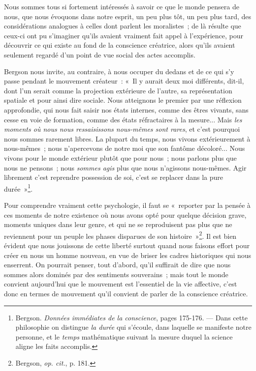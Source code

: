 \documentclass[french,twoside]{book} %
\begin{document}
 Nous sommes tous si fortement intéressés à savoir ce que le monde pensera de nous, que nous évoquons dans notre esprit, un peu plus tôt, un peu plus tard, des considérations analogues à celles dont parlent les moralistes ; de là résulte que ceux-ci ont pu s’imaginer qu’ils avaient vraiment fait appel à l’expérience, pour découvrir ce qui existe au fond de la conscience créatrice, alors qu’ils avaient seulement regardé d’un point de vue social des actes accomplis.\par
Bergson nous invite, au contraire, à nous occuper du dedans et de ce qui s’y passe pendant le mouvement créateur : « Il y aurait deux moi différents, dit-il, dont l’un serait comme la projection extérieure de l’autre, sa représentation spatiale et pour ainsi dire sociale. Nous atteignons le premier par une réflexion approfondie, qui nous fait saisir nos états internes, comme des êtres vivants, sans cesse en voie de formation, comme des états réfractaires à la mesure... Mais \emph{les moments où nous nous ressaisissons nous-mêmes sont rares}, et c’est pourquoi nous sommes rarement libres. La plupart du temps, nous vivons extérieurement à nous-mêmes ; nous n’apercevons  de notre moi que son fantôme décoloré... Nous vivons pour le monde extérieur plutôt que pour nous ; nous parlons plus que nous ne pensons ; nous \emph{sommes agis} plus que nous n’agissons nous-mêmes. Agir librement c’est reprendre possession de soi, c’est se replacer dans la pure durée »\footnote{ \noindent Bergson. \emph{Données immédiates de la conscience}, pages 175-176. — Dans cette philosophie on distingue \emph{la durée} qui s’écoule, dans laquelle se manifeste notre personne, et le \emph{temps} mathématique suivant la mesure duquel la science aligne les faits accomplis.
 }.\par
Pour comprendre vraiment cette psychologie, il faut se « reporter par la pensée à ces moments de notre existence où nous avons opté pour quelque décision grave, moments uniques dans leur genre, et qui ne se reproduisent pas plus que ne reviennent pour un peuple les phases disparues de son histoire »\footnote{ \noindent Bergson, \emph{op. cit.}, p. 181.
 }. Il est bien évident que nous jouissons de cette liberté surtout quand nous faisons effort pour créer en nous un homme nouveau, en vue de briser les cadres historiques qui nous enserrent. On pourrait penser, tout d’abord, qu’il suffirait de dire que nous sommes alors dominés par des sentiments souverains ; mais tout le monde convient aujourd’hui que le mouvement est l’essentiel de la vie affective, c’est donc en termes de mouvement qu’il convient de parler de la conscience créatrice.\par
\end{document}
